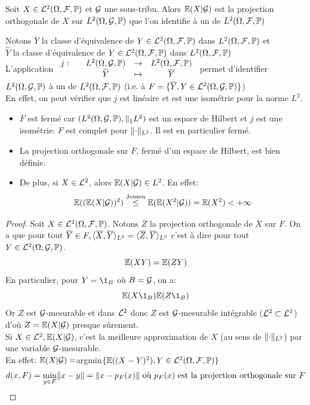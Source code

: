 \documentclass[]{report}
\begin{document}
    \begin{tm}{}{}
        Soit $X\in \mathcal{L}^2(\Omega,\mathcal{F},\mathbb{P})$ et $\mathcal{G}$ une sous-tribu. Alors $\mathbb{E}(X|\mathcal{G})$ est la projection orthogonale de $X$ sur $L^2(\Omega,\mathcal{G},\mathbb{P})$ que l'on identifie à un \sev de $L^2(\Omega,\mathcal{F},\mathbb{P})$
    \end{tm}

    \begin{nt}{}{}
        Notons $\overline{Y}$ la classe d'équivalence de $Y\in \mathcal{L}^2(\Omega,\mathcal{F},\mathbb{P})$ dans $L^2(\Omega,\mathcal{F},\mathbb{P})$ et\\
        $\widehat{Y}$ la classe d'équivalence de $Y\in \mathcal{L}^2(\Omega,\mathcal{F},\mathbb{P})$ dans $L^2(\Omega,\mathcal{F},\mathbb{P})$\\
        L'application $\begin{array}{ccccc} j : & & L^2(\Omega,\mathcal{G},\mathbb{P}) & \to & L^2(\Omega,\mathcal{F},\mathbb{P}) \\ & & \widehat{Y} & \mapsto & \overline{Y} \end{array}$ permet d'identifier $L^2(\Omega,\mathcal{G},\mathbb{P})$ à un \sev de $L^2(\Omega,\mathcal{F},\mathbb{P})$ (i.e. à $F=\{\overline{Y},Y\in \mathcal{L}^2(\Omega,\mathcal{G},\mathbb{P})\}$)\\
        En effet, on peut vérifier que $j$ est linéaire et est une isométrie pour la norme $L^2$.\\
        \begin{itemize}
            \item $F$ est fermé car $(L^2(\Omega,\mathcal{G},\mathbb{P}),\lVert _ \rVert{L^2})$ est un espace de Hilbert et $j$ est une isométrie: $F$ est complet pour $\lVert \cdot \rVert_{L^2}$. Il est en particulier fermé.
            \item La projection orthogonale sur $F$, \sev fermé d'un espace de Hilbert, est bien définie.
            \item De plus, si $X\in \mathcal{L}^2$, alors $\mathbb{E}(X|\mathcal{G})\in L^2$. En effet:
            \[\mathbb{E}((\mathbb{E}(X|\mathcal{G}))^2)\overset{\text{Jensen}}{\le} \mathbb{E}(\mathbb{E}(X^2|\mathcal{G}))=\mathbb{E}(X^2)<+\infty\]
        \end{itemize}
    \end{nt}

    \begin{proof}
        Soit $X\in \mathcal{L}^2(\Omega,\mathcal{F},\mathbb{P})$. Notons $\overline{Z}$ la projection orthogonale de $\overline{X}$ sur $F$. On a que pour tout $\overline{Y}\in F, \langle \overline{X},\overline{Y} \rangle_{L^2}=\langle \overline{Z},\overline{Y} \rangle_{L^2}$ c'est à dire pour tout $Y\in \mathcal{L}^2(\Omega,\mathcal{G},\mathbb{P})$.
        \[\mathbb{E}(XY)=\mathbb{E}(ZY)\]
        En particulier, pour $Y=\1_B$ où $B=\mathcal{G}$, on a:
        \[\Ea(X\1_B)\Ea(Z\1_B)\]
        Or $Z$ est $\mathcal{G}$-mesurable et dans $\mathcal{L}^2$ donc $Z$ est $\mathcal{G}$-mesurable intégrable ($\mathcal{L}^2\subset \mathcal{L}^1$) d'où $Z=\mathbb{E}(X|\mathcal{G})$ presque sûrement.\\
        Si $X\in \mathcal{L}^2, \mathbb{E}(X|\mathcal{G})$, c'est la meilleure approximation de $X$ (au sens de $\lVert \cdot \rVert_{L^2}$) par une variable $\mathcal{G}$-mesurable.\\
        En effet: $\mathbb{E}(X|\mathcal{G})=$argmin$\{\mathbb{E}((X-Y)^2),Y\in \mathcal{L}^2(\Omega,\mathcal{F},\mathbb{P})\}$
        \[d(x,F)=\min_{y\in F}\lVert x-y \rVert=\lVert x-p_{F}(x) \rVert\text{ où $p_F(x)$ est la projection orthogonale sur $F$}\]
    \end{proof}
\end{document}
